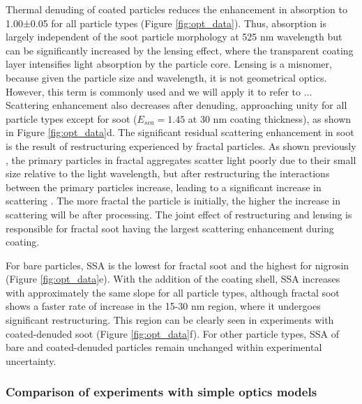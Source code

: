Thermal denuding of coated particles reduces the enhancement in absorption to 1.00±0.05 for all particle types (Figure \ref{fig:opt_data}). Thus, absorption is largely independent of the soot particle morphology at 525 nm wavelength but can be significantly increased by the lensing effect, where the transparent coating layer intensifies light absorption by the particle core. Lensing is a misnomer, because given the particle size and wavelength, it is not geometrical optics. However, this term is commonly used and we will apply it to refer to ...
Scattering enhancement also decreases after denuding, approaching unity for all particle types except for soot ($E_{sca} = 1.45$ at 30 nm coating thickness), as shown in Figure \ref{fig:opt_data}d. The significant residual scattering enhancement in soot is the result of restructuring experienced by fractal particles. As shown previously \citep{RN40}, the primary particles in fractal aggregates scatter light poorly due to their small size relative to the light wavelength, but after restructuring the interactions between the primary particles increase, leading to a significant increase in scattering \citep{RN7}. The more fractal the particle is initially, the higher the increase in scattering will be after processing. The joint effect of restructuring and lensing is responsible for fractal soot having the largest scattering enhancement during coating.

For bare particles, SSA is the lowest for fractal soot and the highest for nigrosin (Figure \ref{fig:opt_data}e). With the addition of the coating shell, SSA increases with approximately the same slope for all particle types, although fractal soot shows a faster rate of increase in the 15-30 nm region, where it undergoes significant restructuring. This region can be clearly seen in experiments with coated-denuded soot (Figure \ref{fig:opt_data}f). For other particle types, SSA of bare and coated-denuded particles remain unchanged within experimental uncertainty.


\subsubsection{Comparison of experiments with simple optics models}

